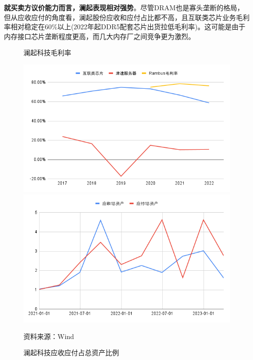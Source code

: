 \documentclass[a4paper,12pt]{ctexart}
\begin{document}
\textbf{就买卖方议价能力而言，澜起表现相对强势}。尽管DRAM也是寡头垄断的格局，但从应收应付的角度看，澜起股份应收和应付占比都不高，且互联类芯片业务毛利率相对稳定在60\%以上(2022年起DDR5配套芯片出货拉低毛利率)。这可能是由于内存接口芯片垄断程度更高，而几大内存厂之间竞争更为激烈。
\begin{figure}[H]
    \begin{minipage}{0.48\linewidth}
        \caption{澜起科技毛利率}
        \centering
        \includegraphics[width=\linewidth]{img/lqmargin.png}
    \end{minipage}
    \begin{minipage}{0.48\linewidth}
        \caption{澜起科技应收应付占总资产比例}
        \centering
        \includegraphics[width=\linewidth]{img/ysyf.png}
    \end{minipage}
    \par\footnotesize{资料来源：Wind}
\end{figure}
\end{document}
